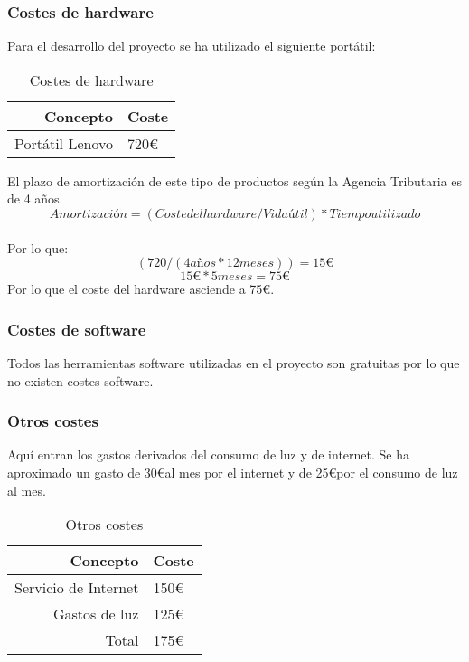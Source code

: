 \subsubsection{Costes de hardware}
Para el desarrollo del proyecto se ha utilizado el siguiente portátil:
\begin{table}[h]
    \begin{center}
        \begin{tabular}{ r | l }
        Concepto & Coste \\ \hline
        Portátil Lenovo & 720\euro \\
        \end{tabular}
    \caption{Costes de hardware}
    \label{tab:costesHardware}
    \end{center}
\end{table}
El plazo de amortización de este tipo de productos según la Agencia Tributaria es de 4 años.\\
$$Amortización=(Coste del hardware /Vidaútil) * Tiempo utilizado$$\\
Por lo que:
$$ (720/(4 años * 12 meses)) = 15\euro $$  
$$ 15\euro * 5 meses = 75\euro $$
Por lo que el coste del hardware asciende a 75\euro.\\
\subsubsection{Costes de software}
Todos las herramientas software utilizadas en el proyecto son gratuitas por lo que no existen costes software.
\subsubsection{Otros costes}
Aquí entran los gastos derivados del consumo de luz y de internet. Se ha aproximado un gasto de 30\euro al mes por el internet y de 25\euro por el consumo de luz al mes.
\begin{table}[h]
    \begin{center}
        \begin{tabular}{ r | l }
        Concepto & Coste \\ \hline
        Servicio de Internet & 150\euro \\
        Gastos de luz & 125\euro \\
        Total & 175\euro \\ 
        \end{tabular}
    \caption{Otros costes}
    \label{tab:otrosCostes}
    \end{center}
\end{table}



